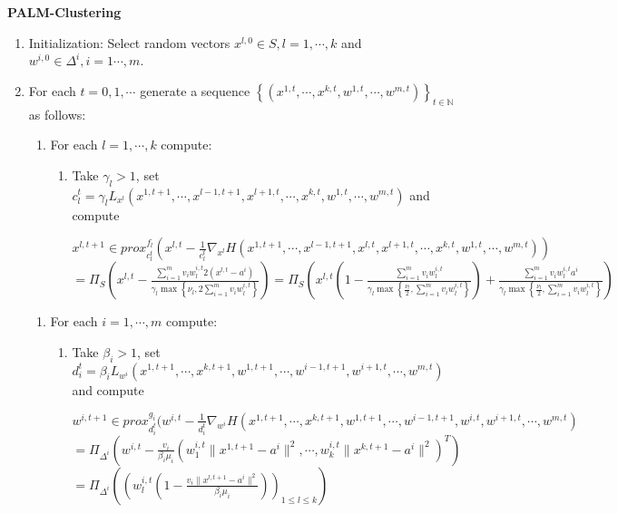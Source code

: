 \documentclass[11pt]{article}
\numberwithin{equation}{section}
\begin{document}
{\bf PALM-Clustering}
\begin{enumerate}[(1)]
  \item Initialization: Select random vectors $x^{l,0} \in S, l=1, \cdots ,k$ and $w^{i,0} \in \Delta^i, i=1 \cdots ,m$.
  \item For each $t=0,1, \cdots$ generate a sequence $\left\lbrace (x^{1,t}, \cdots , x^{k,t}, w^{1,t}, \cdots ,w^{m,t}) \right\rbrace_{t \in \mathbb{N}}$ as follows:
  \begin{enumerate}[(2.1)]
  	\item For each $l=1, \cdots ,k $ compute:
  	\begin{enumerate}[(2.1.1)]
  		\item Take $\gamma_l>1$, set $c^t_l = \gamma_l L_{x^l}(x^{1,t+1}, \cdots, x^{l-1,t+1}, x^{l+1,t}, \cdots ,x^{k,t}, w^{1,t}, \cdots ,w^{m,t})$ and compute
  		\begin{center}
  			$x^{l,t+1} \in prox^{f_l}_{c^t_l}(x^{l,t} - \frac{1}{c^t_l}\nabla_{x^l}H(x^{1,t+1}, \cdots, x^{l-1,t+1}, x^{l,t}, x^{l+1,t}, \cdots ,x^{k,t}, w^{1,t}, \cdots ,w^{m,t}))$ \\ $= \Pi_S \left( x^{l,t} - \frac{\sum\limits_{i=1}^m v_iw^{i,t}_l 2(x^{l,t}-a^i)}{\gamma_l \max \left\lbrace \nu_l, 2\sum\limits_{i=1}^m v_iw^{i,t}_l \right\rbrace}\right) = \Pi_S \left( x^{l,t}\left(1- \frac{\sum\limits_{i=1}^m v_iw^{i,t}_l}{\gamma_l \max \left\lbrace \frac{\nu_l}{2}, \sum\limits_{i=1}^m v_iw^{i,t}_l \right\rbrace}\right) + \frac{\sum\limits_{i=1}^m v_iw^{i,t}_l a^i}{\gamma_l \max \left\lbrace \frac{\nu_l}{2}, \sum\limits_{i=1}^m v_iw^{i,t}_l \right\rbrace} \right)$
  		\end{center}
  	\end{enumerate}
  \end{enumerate}
  \begin{enumerate}[(2.2)]
  	\item For each $i=1, \cdots ,m $ compute:
  	\begin{enumerate}[(2.2.1)]
  		\item Take $\beta_i>1$, set $d^t_i = \beta_i L_{w^i}(x^{1,t+1}, \cdots ,x^{k,t+1}, w^{1,t+1}, \cdots ,w^{i-1,t+1}, w^{i+1,t}, \cdots ,w^{m,t})$ and compute
  		\begin{center}
  			$w^{i,t+1} \in prox^{g_i}_{d^t_i}(w^{i,t} - \frac{1}{d^t_i}\nabla_{w^i}H(x^{1,t+1}, \cdots ,x^{k,t+1}, w^{1,t+1}, \cdots ,w^{i-1,t+1}, w^{i,t}, w^{i+1,t}, \cdots ,w^{m,t})$ \\ $= \Pi_{\Delta^i}(w^{i,t} - \frac{v_i}{\beta_i \mu_i} (w^{i,t}_1 \| x^{1,t+1} - a^i \|^2, \cdots , w^{i,t}_k \| x^{k,t+1} - a^i \|^2 )^T)$ \\ $ = \Pi_{\Delta^i}((w^{i,t}_l (1 - \frac{v_i \| x^{l,t+1} - a^i \|^2}{\beta_i \mu_i} ))_{1 \leq l \leq k})$
  		\end{center}
  	\end{enumerate}
  \end{enumerate}
\end{enumerate}
\end{document}
